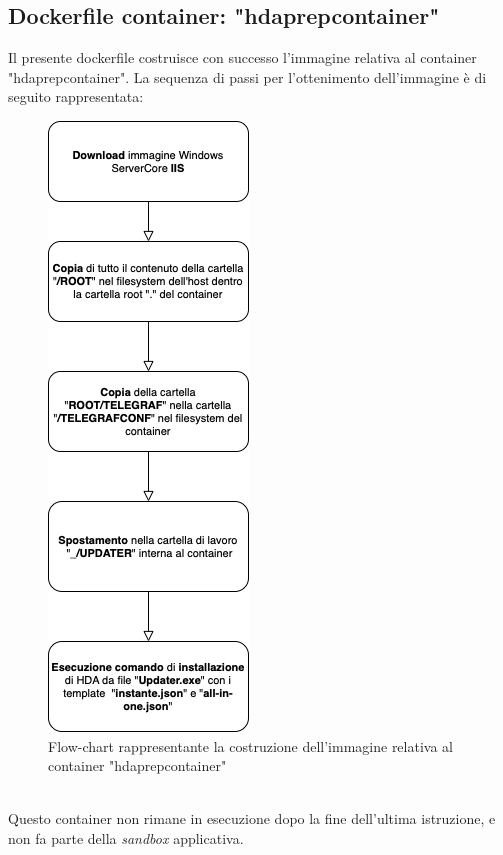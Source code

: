 \subsection{Dockerfile container: "hdaprepcontainer"}
Il presente dockerfile costruisce con successo l'immagine relativa al container "hdaprepcontainer". La sequenza di passi per l'ottenimento dell'immagine è di seguito rappresentata:
\begin{figure}[!h]     
\centering 
    \includegraphics[width=0.3\columnwidth]{immagini/flowchart/flowchart_hdaprepcontainer} 
    \caption{Flow-chart rappresentante la costruzione dell'immagine relativa al container "hdaprepcontainer"}
\end{figure} \\
Questo container non rimane in esecuzione dopo la fine dell'ultima istruzione, e non fa parte della \textit{sandbox} applicativa.\\
\newpage
